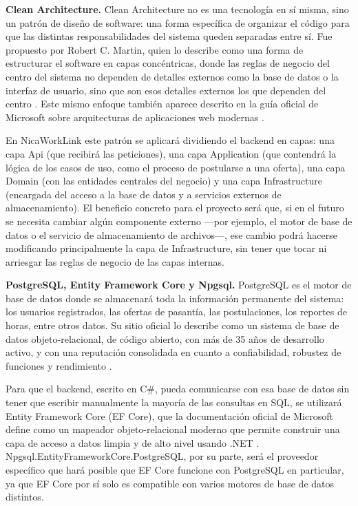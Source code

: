 \textbf{Clean Architecture.} Clean Architecture no es una tecnología en sí misma, sino un patrón de diseño de software: una forma específica de organizar el código para que las distintas responsabilidades del sistema queden separadas entre sí. Fue propuesto por Robert C. Martin, quien lo describe como una forma de estructurar el software en capas concéntricas, donde las reglas de negocio del centro del sistema no dependen de detalles externos como la base de datos o la interfaz de usuario, sino que son esos detalles externos los que dependen del centro \parencite{martin2017}. Este mismo enfoque también aparece descrito en la guía oficial de Microsoft sobre arquitecturas de aplicaciones web modernas \parencite{microsoft_webarch}.

En NicaWorkLink este patrón se aplicará dividiendo el backend en capas: una capa Api (que recibirá las peticiones), una capa Application (que contendrá la lógica de los casos de uso, como el proceso de postularse a una oferta), una capa Domain (con las entidades centrales del negocio) y una capa Infrastructure (encargada del acceso a la base de datos y a servicios externos de almacenamiento). El beneficio concreto para el proyecto será que, si en el futuro se necesita cambiar algún componente externo ---por ejemplo, el motor de base de datos o el servicio de almacenamiento de archivos---, ese cambio podrá hacerse modificando principalmente la capa de Infrastructure, sin tener que tocar ni arriesgar las reglas de negocio de las capas internas.

\textbf{PostgreSQL, Entity Framework Core y Npgsql.} PostgreSQL es el motor de base de datos donde se almacenará toda la información permanente del sistema: los usuarios registrados, las ofertas de pasantía, las postulaciones, los reportes de horas, entre otros datos. Su sitio oficial lo describe como un sistema de base de datos objeto-relacional, de código abierto, con más de 35 años de desarrollo activo, y con una reputación consolidada en cuanto a confiabilidad, robustez de funciones y rendimiento \parencite{postgresql}.

Para que el backend, escrito en C\#, pueda comunicarse con esa base de datos sin tener que escribir manualmente la mayoría de las consultas en SQL, se utilizará Entity Framework Core (EF Core), que la documentación oficial de Microsoft define como un mapeador objeto-relacional moderno que permite construir una capa de acceso a datos limpia y de alto nivel usando .NET \parencite{microsoft_efcore}. Npgsql.EntityFrameworkCore.PostgreSQL, por su parte, será el proveedor específico que hará posible que EF Core funcione con PostgreSQL en particular, ya que EF Core por sí solo es compatible con varios motores de base de datos distintos.

